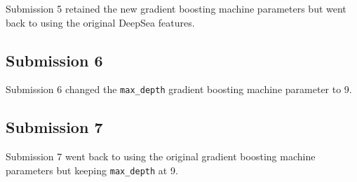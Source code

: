 \documentclass{article}
\begin{document}
Submission 5 retained the new gradient boosting machine parameters but went
back to using the original DeepSea features.


\subsection*{Submission 6}

Submission 6 changed the \texttt{max\_depth} gradient boosting machine parameter
to 9.


\subsection*{Submission 7}

Submission 7 went back to using the original gradient boosting machine parameters
but keeping \texttt{max\_depth} at 9.
\end{document}
